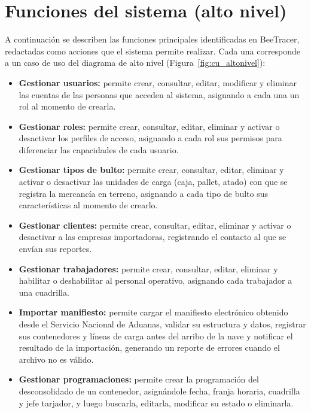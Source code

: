 \chapter{Funciones del sistema (alto nivel)}
\label{cap:funciones}

A continuación se describen las funciones principales identificadas en BeeTracer, redactadas como
acciones que el sistema permite realizar. Cada una corresponde a un caso de uso del diagrama de
alto nivel (Figura~\ref{fig:cu_altonivel}):

\begin{itemize}
    \item \textbf{Gestionar usuarios:} permite crear, consultar, editar, modificar y eliminar las
          cuentas de las personas que acceden al sistema, asignando a cada una un rol al momento
          de crearla.
    \item \textbf{Gestionar roles:} permite crear, consultar, editar, eliminar y activar o
          desactivar los perfiles de acceso, asignando a cada rol sus permisos para diferenciar las
          capacidades de cada usuario.
    \item \textbf{Gestionar tipos de bulto:} permite crear, consultar, editar, eliminar y activar
          o desactivar las unidades de carga (caja, pallet, atado) con que se registra la mercancía
          en terreno, asignando a cada tipo de bulto sus características al momento de crearlo.
    \item \textbf{Gestionar clientes:} permite crear, consultar, editar, eliminar y activar o
          desactivar a las empresas importadoras, registrando el contacto al que se envían sus
          reportes.
    \item \textbf{Gestionar trabajadores:} permite crear, consultar, editar, eliminar y habilitar
          o deshabilitar al personal operativo, asignando cada trabajador a una cuadrilla.
    \item \textbf{Importar manifiesto:} permite cargar el manifiesto electrónico obtenido desde el
          Servicio Nacional de Aduanas, validar su estructura y datos, registrar sus contenedores y
          líneas de carga antes del arribo de la nave y notificar el resultado de la importación,
          generando un reporte de errores cuando el archivo no es válido.
    \item \textbf{Gestionar programaciones:} permite crear la programación del desconsolidado de un
          contenedor, asignándole fecha, franja horaria, cuadrilla y jefe tarjador, y luego
          buscarla, editarla, modificar su estado o eliminarla.

\end{itemize}
